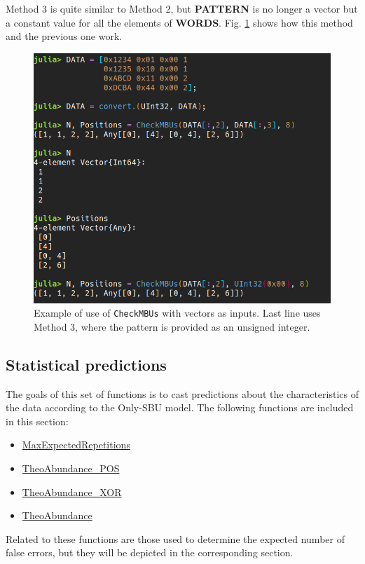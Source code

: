 \begin{itemize}
	Method 3 is quite similar to Method 2, but \textbf{PATTERN} is no longer a vector but a constant value for all the elements of \textbf{WORDS}. Fig. \ref{fig:Example_CheckMBUs_M23} shows how this method and the previous one work.
	
	\begin{figure}[h!]
		\centering
		\includegraphics[width=0.75\columnwidth]{fig/functions/CheckMBUs_Methods2_3.png}
		\caption{Example of use of \texttt{CheckMBUs} with vectors as inputs. Last line uses Method 3, where the pattern is provided as an unsigned integer.}
		\label{fig:Example_CheckMBUs_M23}
	\end{figure}
	
\end{itemize}
%
\subsection{Statistical predictions}\label{Subsec:StatisticalPredictions}
%
The goals of this set of functions is to cast predictions about the characteristics of the data according to the Only-SBU model. The following functions are included in this section:

\begin{itemize}
	\item \hyperref[Subsec:MaxExpectedRepetitions]{MaxExpectedRepetitions}
	\item \hyperref[Subsec:TheoAbundance_POS]{TheoAbundance\_POS}
	\item \hyperref[Subsec:TheoAbundance_XOR]{TheoAbundance\_XOR}
	\item \hyperref[Subsec:TheoAbundance]{TheoAbundance}
\end{itemize}

Related to these functions are those used to determine the expected number of false errors, but they will be depicted in the corresponding section.
%
